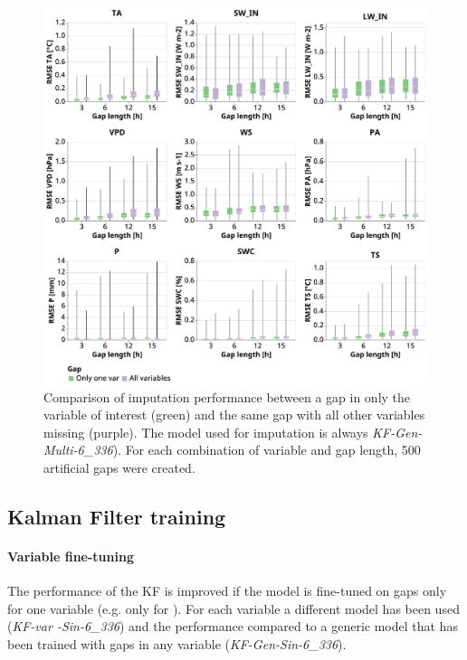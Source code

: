 \documentclass{article}
\newcommand{\imgwidth}{6in}
\let\Oldsubsection\subsection
\renewcommand{\subsection}{\FloatBarrier\Oldsubsection}
\begin{document}
\begin{figure}
\centerline{\includegraphics[width=\imgwidth]{gap_single_var}}
\caption{Comparison of imputation performance between a gap in only the variable of interest (green) and the same gap with all other variables missing (purple). The model used for imputation is always \textit{KF-Gen-Multi-6\_336}). For each combination of variable and gap length, 500 artificial gaps were created.}
\label{fig:gap_single_var}
\end{figure}

\subsection{Kalman Filter training}

\paragraph{Variable fine-tuning} The performance of the KF is improved if the model is fine-tuned on gaps only for one variable (e.g. only for ). For each variable a different model has been used (\textit{KF-\textlangle var \textrangle-Sin-6\_336}) and the performance compared to a generic model that has been trained with gaps in any variable (\textit{KF-Gen-Sin-6\_336}).
\end{document}
